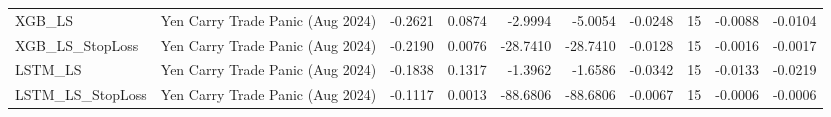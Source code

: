 \begin{tabular}{llrrrrrrrr}
\cline{1-10}
XGB\_LS & Yen Carry Trade Panic (Aug 2024) & -0.2621 & 0.0874 & -2.9994 & -5.0054 & -0.0248 & 15 & -0.0088 & -0.0104 \\
\cline{1-10}
XGB\_LS\_StopLoss & Yen Carry Trade Panic (Aug 2024) & -0.2190 & 0.0076 & -28.7410 & -28.7410 & -0.0128 & 15 & -0.0016 & -0.0017 \\
\cline{1-10}
LSTM\_LS & Yen Carry Trade Panic (Aug 2024) & -0.1838 & 0.1317 & -1.3962 & -1.6586 & -0.0342 & 15 & -0.0133 & -0.0219 \\
\cline{1-10}
LSTM\_LS\_StopLoss & Yen Carry Trade Panic (Aug 2024) & -0.1117 & 0.0013 & -88.6806 & -88.6806 & -0.0067 & 15 & -0.0006 & -0.0006 \\
\cline{1-10}
\bottomrule
\end{tabular}

